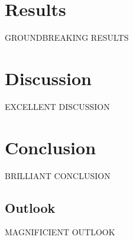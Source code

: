 \documentclass[a4paper, 10pt]{article}
\begin{document}
	\section{Results}
	GROUNDBREAKING RESULTS
	\section{Discussion}
	EXCELLENT DISCUSSION
	\section{Conclusion}
	BRILLIANT CONCLUSION
	\subsection{Outlook}
	MAGNIFICIENT OUTLOOK
	
	
	\pagebreak
\end{document}
